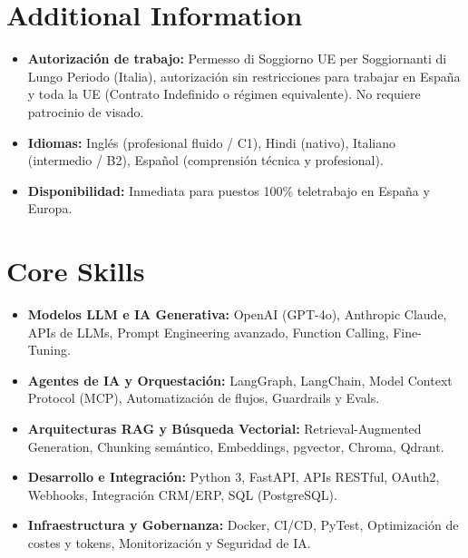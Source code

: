 \documentclass[a4paper,10pt]{article}
\begin{document}
\section{Additional Information}
\begin{itemize}
  \item \textbf{Autorización de trabajo:} Permesso di Soggiorno UE per Soggiornanti di Lungo Periodo (Italia), autorización sin restricciones para trabajar en España y toda la UE (Contrato Indefinido o régimen equivalente). No requiere patrocinio de visado.
  \item \textbf{Idiomas:} Inglés (profesional fluido / C1), Hindi (nativo), Italiano (intermedio / B2), Español (comprensión técnica y profesional).
  \item \textbf{Disponibilidad:} Inmediata para puestos 100\% teletrabajo en España y Europa.
\end{itemize}

\section{Core Skills}
\begin{itemize}
  \item \textbf{Modelos LLM e IA Generativa:} OpenAI (GPT-4o), Anthropic Claude, APIs de LLMs, Prompt Engineering avanzado, Function Calling, Fine-Tuning.
  \item \textbf{Agentes de IA y Orquestación:} LangGraph, LangChain, Model Context Protocol (MCP), Automatización de flujos, Guardrails y Evals.
  \item \textbf{Arquitecturas RAG y Búsqueda Vectorial:} Retrieval-Augmented Generation, Chunking semántico, Embeddings, pgvector, Chroma, Qdrant.
  \item \textbf{Desarrollo e Integración:} Python 3, FastAPI, APIs RESTful, OAuth2, Webhooks, Integración CRM/ERP, SQL (PostgreSQL).
  \item \textbf{Infraestructura y Gobernanza:} Docker, CI/CD, PyTest, Optimización de costes y tokens, Monitorización y Seguridad de IA.
\end{itemize}
\end{document}
